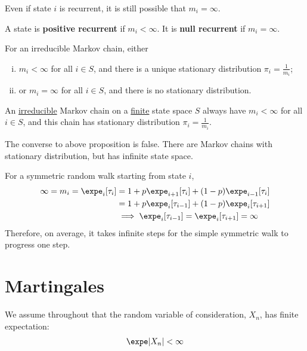 \documentclass{article}
\begin{document}
	\begin{remark}
		Even if state $i$ is recurrent, it is still possible that $m_i = \infty$.
	\end{remark}
	
	\begin{definition}
		A state is \textbf{positive recurrent} if $m_i < \infty$. It is \textbf{null recurrent} if $m_i = \infty$.
	\end{definition}
	
	\begin{theorem}
		For an irreducible Markov chain, either
		\begin{enumerate}[(i)]
			\item $m_i < \infty$ for all $i \in S$, and there is a unique stationary distribution $\pi_i = \frac{1}{m_i}$;
			\item or $m_i = \infty$ for all $i \in S$, and there is no stationary distribution.
		\end{enumerate}
	\end{theorem}
	
	\begin{proposition}
		An \ul{irreducible} Markov chain on a \ul{finite} state space $S$ always have $m_i < \infty$ for all $i \in S$, and this chain has stationary distribution $\pi_i = \frac{1}{m_i}$.
	\end{proposition}
	
	\begin{remark}
		The converse to above proposition is false. There are Markov chains with stationary distribution, but has infinite state space.
	\end{remark}
	
	\begin{proposition}
		For a symmetric random walk starting from state $i$,
		\begin{align}
			\infty = m_i = \expe_i[\tau_i] &= 1 + p \expe_{i+1}[\tau_i] + (1-p) \expe_{i-1} [\tau_i] \\
			&= 1 + p \expe_{i}[\tau_{i-1}] + (1-p) \expe_{i} [\tau_{i+1}] \\
			&\implies \expe_{i}[\tau_{i-1}] = \expe_{i} [\tau_{i+1}] = \infty
		\end{align}
		Therefore, on average, it takes infinite steps for the simple symmetric walk to progress one step.
	\end{proposition}
	
	\section{Martingales}
	\begin{assumption}
		We assume throughout that the random variable of consideration, $X_n$, has finite expectation:
		\begin{align}
			\expe |X_n| < \infty
		\end{align}
	\end{assumption}
	
\end{document}
